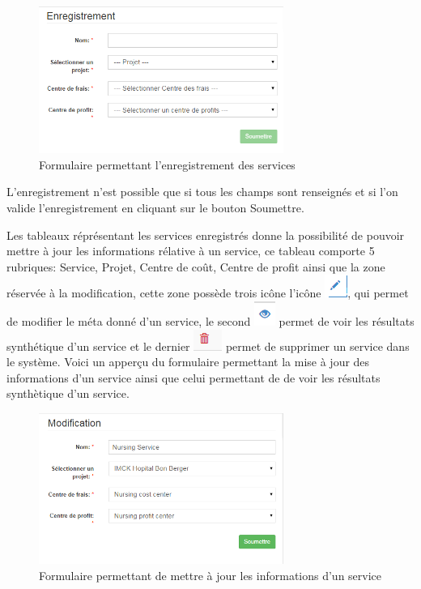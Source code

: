 \documentclass[12pt,a4paper]{report}
\begin{document}
\begin{figure}[h]
\begin{center}
\includegraphics[width=8cm]{pic/ServiceSave.png}
\end{center}
\caption{Formulaire permettant l'enregistrement des services}
\label{Formulaire permettant l'enregistrement des services}
\end{figure} 

L'enregistrement n'est possible que si tous les champs sont renseignés et si l'on valide l'enregistrement en cliquant sur le bouton Soumettre. 

Les tableaux réprésentant les services enregistrés donne la possibilité de pouvoir mettre à jour les informations rélative à un service, ce tableau comporte 5 rubriques: Service, Projet, Centre de coût, Centre de profit ainsi que la zone réservée à la modification, cette zone possède trois icône l'icône \includegraphics[scale=0.7]{pic/EditUser.png}, qui permet de modifier le méta donné d'un service, le second \includegraphics[scale=0.7]{pic/EyesBlue.png} permet de voir les résultats synthétique d'un service et le dernier \includegraphics[scale=0.7]{pic/DeleteWRed.png} permet de supprimer un service dans le système.
\newpage
Voici un apperçu du formulaire permettant la mise à jour des informations d'un service ainsi que celui permettant de de voir les résultats synthètique d'un service.

\begin{figure}[h]
\begin{center}
\includegraphics[width=8cm]{pic/UpdateService.png}
\end{center}
\caption{Formulaire permettant de mettre à jour les informations d'un service}
\label{Formulaire permettant de mettre à jour les informations d'un service}
\end{figure} 
\end{document}
